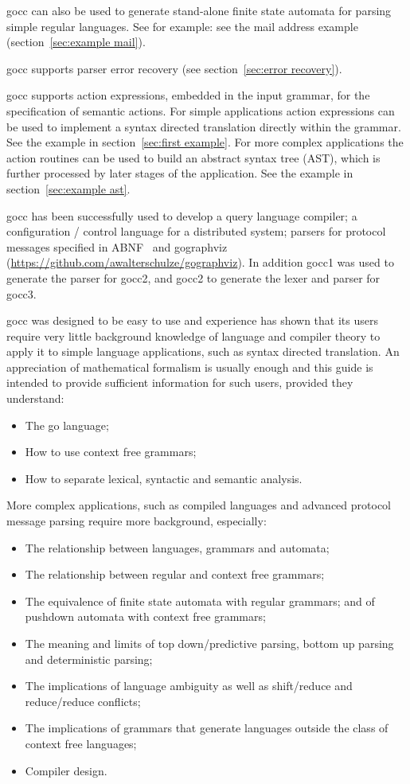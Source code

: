 \documentclass[12pt]{article}
\begin{document}
	gocc can also be used to generate stand-alone finite state automata for parsing simple regular languages. See for example: see the mail address example (section~\ref{sec:example mail}).

	gocc supports parser error recovery (see section~\ref{sec:error recovery}).

	gocc supports action expressions, embedded in the input grammar, for the specification of semantic actions. For simple applications action expressions can be used to implement a syntax directed translation directly within the grammar. See the example in section~\ref{sec:first example}. For more complex applications the action routines can be used to build an abstract syntax tree (AST), which is further processed by later stages of the application. See the example in section~\ref{sec:example ast}.

	gocc has been successfully used to develop a query language compiler; a configuration / control language for a distributed system; parsers for protocol messages specified in ABNF~\cite{ABNF} and gographviz (\url{https://github.com/awalterschulze/gographviz}). In addition gocc1 was used to generate the parser for gocc2, and gocc2 to generate the lexer and parser for gocc3.

	gocc was designed to be easy to use and experience has shown that its users require very little background knowledge of language and compiler theory to apply it to simple language applications, such as syntax directed translation. An appreciation of mathematical formalism is usually enough and this guide is intended to provide sufficient information for such users, provided they understand:
	\begin{itemize}
		\item The go language;
		\item How to use context free grammars;
		\item How to separate lexical, syntactic and semantic analysis.
	\end{itemize}

	More complex applications, such as compiled languages and advanced protocol message parsing require more background, especially:
	\begin{itemize}
		\item The relationship between languages, grammars and automata;
		\item The relationship between regular and context free grammars;
		\item The equivalence of finite state automata with regular grammars; and of pushdown automata with context free grammars;
		\item The meaning and limits of top down/predictive parsing, bottom up parsing and deterministic parsing;
		\item The implications of language ambiguity as well as shift/reduce and reduce/reduce conflicts;
		\item The implications of grammars that generate languages outside the class of context free languages;
		\item Compiler design.
	\end{itemize}
\end{document}
